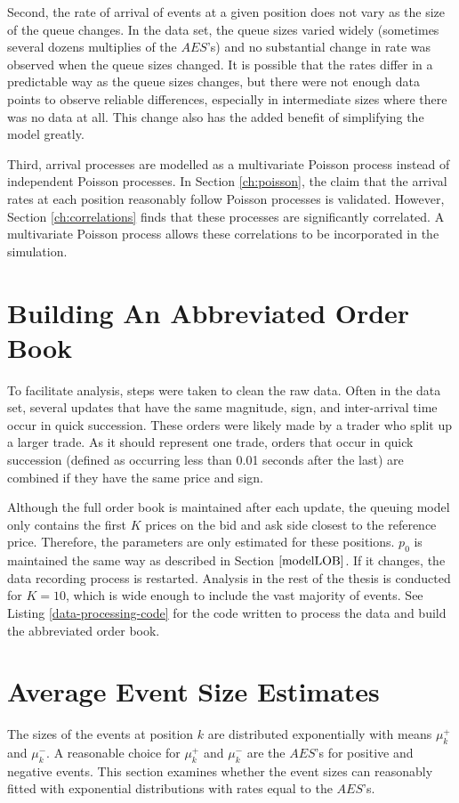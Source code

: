 Second, the rate of arrival of events at a given position does not vary as the size of the queue changes. In the data set, the queue sizes varied widely (sometimes several dozens multiplies of the $AES$'s) and no substantial change in rate was observed when the queue sizes changed. It is possible that the rates differ in a predictable way as the queue sizes changes, but there were not enough data points to observe reliable differences, especially in intermediate sizes where there was no data at all. This change also has the added benefit of simplifying the model greatly.

Third, arrival processes are modelled as a multivariate Poisson process instead of independent Poisson processes. In Section \ref{ch:poisson}, the claim that the arrival rates at each position reasonably follow Poisson processes is validated. However, Section \ref{ch:correlations} finds that these processes are significantly correlated. A multivariate Poisson process allows these correlations to be incorporated in the simulation.

\section{Building An Abbreviated Order Book}
To facilitate analysis, steps were taken to clean the raw data. Often in the data set, several updates that have the same magnitude, sign, and inter-arrival time occur in quick succession. These orders were likely made by a trader who split up a larger trade. As it should represent one trade, orders that occur in quick succession (defined as occurring less than 0.01 seconds after the last) are combined if they have the same price and sign. 

Although the full order book is maintained after each update, the queuing model only contains the first $K$ prices on the bid and ask side closest to the reference price. Therefore, the parameters are only estimated for these positions. $p_0$ is maintained the same way as described in Section $\ref{modelLOB}$. If it changes, the data recording process is restarted. Analysis in the rest of the thesis is conducted for $K=10$, which is wide enough to include the vast majority of events. See Listing \ref{data-processing-code} for the code written to process the data and build the abbreviated order book.

\section{Average Event Size Estimates}\label{ch:event_sizes}
The sizes of the events at position $k$ are distributed exponentially with means $\mu^+_k$ and $\mu^-_k$. A reasonable choice for $\mu^+_k$ and $\mu^-_k$ are the $AES$'s for positive and negative events. This section examines whether the event sizes can reasonably fitted with exponential distributions with rates equal to the $AES$'s. 

